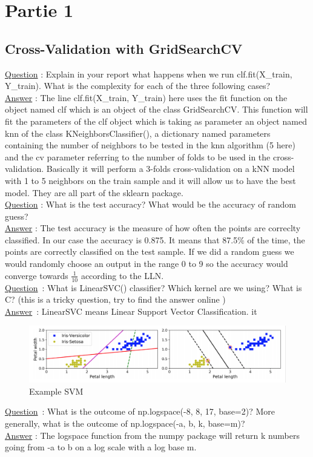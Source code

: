 \section{Partie 1}

\subsection{Cross-Validation with GridSearchCV}
\underline{Question} : Explain in your report what happens when we run clf.fit(X\_train, Y\_train). What is the complexity for each of the three following cases?  \\ 

\underline{Answer} :  The line clf.fit(X\_train, Y\_train) here uses the fit function on the object named clf which is an object of the class GridSearchCV. This function will fit the parameters of the clf object which is taking as parameter an object named knn of the class KNeighborsClassifier(), a dictionary named parameters containing the number of neighbors to be tested in the knn algorithm (5 here) and the cv parameter referring to the number of folds to be used in the cross-validation. Basically it will perform a 3-folds cross-validation on a kNN model with 1 to 5 neighbors on the train sample and it will allow us to have the best model. They are all part of the sklearn package. \\

\underline{Question} : What is the test accuracy? What would be the accuracy of random guess? \\

\underline{Answer} : The test accuracy is the measure of how often the points are correclty classified. In our case the accuracy is 0.875.  It means that 87.5\% of the time, the points are correctly classified on the test sample. If we did a random guess we would randomly choose an output in the range 0 to 9 so the accuracy would converge towards $\frac{1}{10}$ according to the LLN.  \\


\underline{Question} :  What is LinearSVC() classifier? Which kernel are we using? What is C? (this is a tricky question, try to find the answer online )\\

\underline{Answer} : LinearSVC means Linear Support Vector Classification. it  \\

\begin{figure}[ht]
	\centering 
	\includegraphics[scale = 0.35]{Pics/SVM}
	\caption{Example SVM}
\end{figure}

\underline{Question} : What is the outcome of np.logspace(-8, 8, 17, base=2)? More generally, what is the outcome of np.logspace(-a, b, k, base=m)?\\

\underline{Answer} : The logspace function from the numpy package will return k numbers going from -a to b on a log scale with a log base m. 